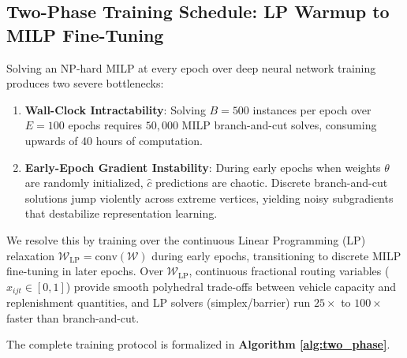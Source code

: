 \documentclass[11pt,a4paper]{article}
\theoremstyle{definition}
\theoremstyle{remark}
\begin{document}
\subsection{Two-Phase Training Schedule: LP Warmup to MILP Fine-Tuning}
Solving an NP-hard MILP at every epoch over deep neural network training produces two severe bottlenecks:
\begin{enumerate}[label=(\roman*)]
    \item \textbf{Wall-Clock Intractability}: Solving $B = 500$ instances per epoch over $E = 100$ epochs requires $50,000$ MILP branch-and-cut solves, consuming upwards of 40 hours of computation.
    \item \textbf{Early-Epoch Gradient Instability}: During early epochs when weights $\theta$ are randomly initialized, $\hat{c}$ predictions are chaotic. Discrete branch-and-cut solutions jump violently across extreme vertices, yielding noisy subgradients that destabilize representation learning.
\end{enumerate}

We resolve this by training over the continuous Linear Programming (LP) relaxation $\mathcal{W}_{\text{LP}} = \text{conv}(\mathcal{W})$ during early epochs, transitioning to discrete MILP fine-tuning in later epochs. Over $\mathcal{W}_{\text{LP}}$, continuous fractional routing variables ($x_{ijt} \in [0, 1]$) provide smooth polyhedral trade-offs between vehicle capacity and replenishment quantities, and LP solvers (simplex/barrier) run $25\times$ to $100\times$ faster than branch-and-cut.

The complete training protocol is formalized in \textbf{Algorithm \ref{alg:two_phase}}.
\end{document}
